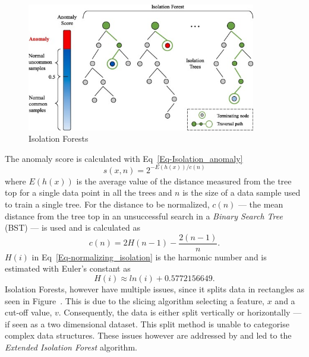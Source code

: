 \begin{figure}[h!tb]
	\centering
	
	\includegraphics[width=10cm]{fig/Isolation_Forests} %
	
	\caption[Isolation Forest]{Isolation Forests \cite{Chen2020}}
	\label{Figure-Isolation_Forest} 
\end{figure}

The anomaly score is calculated with Eq~\ref{Eq-Isolation_anomaly}
\begin{equation}
s(x,n) = 2^{-E(h(x))/c(n)}
\label{Eq-Isolation_anomaly}
\end{equation}
where $E(h(x))$ is the average value of the distance measured from the tree top for a single data point in all the trees \cite{Hariri2021} and $n$ is the size of a data sample used to train a single tree. For the distance to be normalized, $c(n)$ --- the mean distance from the tree top in an unsuccessful search in a \emph{Binary Search Tree} (BST) --- is used and is calculated as 
\begin{equation}
c(n) = 2H(n-1) - \frac{2(n-1)}{n}.
\label{Eq-normalizing_isolation}
\end{equation}
$H(i)$ in Eq~\ref{Eq-normalizing_isolation} is the harmonic number and is estimated with Euler's constant as 
\begin{equation}
H(i) \approx ln(i) + 0.5772156649.
\label{Eq-H_i}
\end{equation}
Isolation Forests, however have multiple issues, since it splits data in rectangles as seen in Figure~. This is due to the slicing algorithm selecting a feature, $x$ and a cut-off value, $v$. Consequently, the data is either split vertically or horizontally --- if seen as a two dimensional dataset. This split method is unable to categorise complex data structures. These issues however are addressed by \textcite{Hariri2021} and led to the \emph{Extended Isolation Forest} algorithm.

